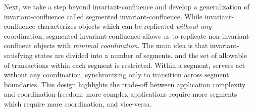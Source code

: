 

Next, we take a step beyond invariant-confluence and develop a generalization
of invariant-confluence called segmented invariant-confluence. While
invariant-confluence characterizes objects which can be replicated
\emph{without any} coordination, segmented invariant-confluence allows us to
replicate non-invariant-confluent objects with \emph{minimal coordination}. The
main idea is that invariant-satisfying states are divided into a number of
segments, and the set of allowable of transactions within each segment is
restricted. Within a segment, servers act without any coordination,
synchronizing only to transition across segment boundaries. This design
highlights the trade-off between application complexity and
coordination-freedom; more complex applications require more segments which
require more coordination, and vice-versa.



